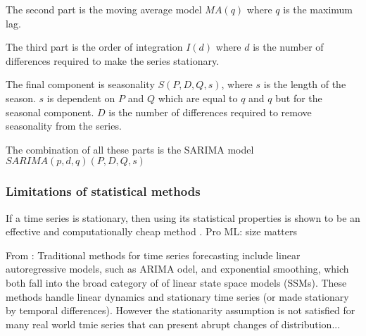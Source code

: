 The second part is the moving average model $MA(q)$ where $q$ is the maximum lag.

The third part is the order of integration $I(d)$ where $d$ is the number of
differences required to make the series stationary.

The final component is seasonality $S(P, D, Q, s)$, where $s$ is the length
of the season.
$s$ is dependent on $P$ and $Q$ which are equal to $q$ and $q$ but for the seasonal component.
$D$ is the number of differences required to remove seasonality from the series.

The combination of all these parts is the SARIMA model $SARIMA(p, d, q)(P, D, Q, s)$

\subsubsection{Limitations of statistical methods}
If a time series is stationary, then using its statistical properties is shown to be an effective and computationally cheap method \cite{Makridakis2018}.
Pro ML: size matters \cite{Cerqueira2019}

From \cite{Guen2019}:
Traditional methods for time series forecasting include linear autoregressive models, such as
ARIMA odel, and exponential smoothing, which both fall into the broad category of of linear 
state space models (SSMs). These methods handle linear
dynamics and stationary time series (or made stationary by temporal differences).
However the stationarity assumption is not satisfied for many real world tmie series that can present
abrupt changes of distribution...